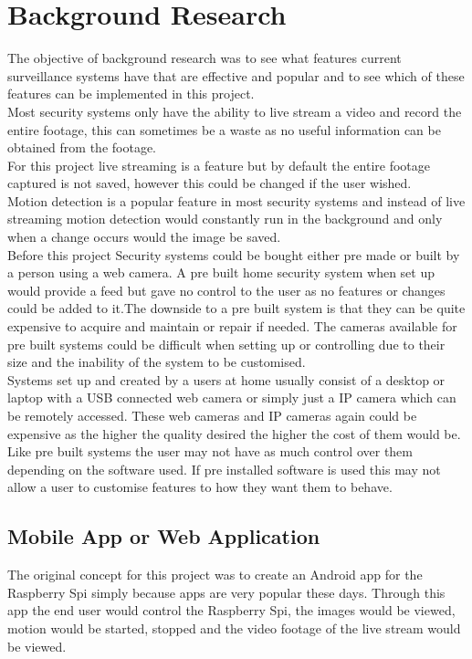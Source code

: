 \documentclass[12pt]{report}
\begin{document}
\section{Background Research}
\label{sec:research}

The objective of background research was to see what features current surveillance systems have that are effective and popular and to see which of these features can be implemented in this project.\\

Most security systems only have the ability to live stream a video and record the entire footage, this can sometimes be a waste as no useful information can be obtained from the footage.\\ 

For this project live streaming is a feature but by default the entire footage captured is not saved, however this could be changed if the user wished.\\

Motion detection is a popular feature in most security systems and instead of live streaming motion detection would constantly run in the background and only when a change occurs would the image be saved. \\

Before this project Security systems could be bought either pre made or built by a person using a web camera. A pre built home security system when set up would provide a feed but gave no control to the user as no features or changes could be added to it.The downside to a pre built system is that they can be quite expensive to acquire and maintain or repair if needed. The cameras available for pre built systems could be difficult when setting up or controlling due to their size and the inability of the system to be customised.\\

Systems set up and created by a users at home usually consist of a desktop or laptop with a USB connected web camera or simply just a IP camera which can be remotely accessed. These web cameras and IP cameras again could be expensive as the higher the quality desired the higher the cost of them would be. Like pre built systems the user may not have as much control over them depending on the software used. If pre installed software is used this may not allow a user to customise features to how they want them to behave.\\ 

\subsection{Mobile App or Web Application}
\label{subsec:Android}
The original concept for this project was to create an Android app for the Raspberry Spi simply because apps are very popular these days. Through this app the end user would control the Raspberry Spi, the images would be viewed, motion would be started, stopped and the video footage of the live stream would be viewed.\\
\end{document}
